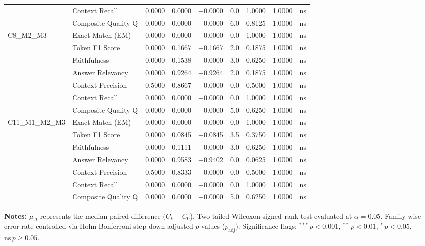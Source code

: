 \begin{table}[p]
\begin{tabular*}{\textwidth}{@{\extracolsep{\fill}} l l r r r r r r c @{}}
               & Context Recall      & 0.0000 & 0.0000 & +0.0000 & 0.0 & 1.0000 & 1.0000 & ns \\
               & Composite Quality Q & 0.0000 & 0.0000 & +0.0000 & 6.0 & 0.8125 & 1.0000 & ns \\
\addlinespace
C8\_M2\_M3      & Exact Match (EM)    & 0.0000 & 0.0000 & +0.0000 & 0.0 & 1.0000 & 1.0000 & ns \\
               & Token F1 Score      & 0.0000 & 0.1667 & +0.1667 & 2.0 & 0.1875 & 1.0000 & ns \\
               & Faithfulness        & 0.0000 & 0.1538 & +0.0000 & 3.0 & 0.6250 & 1.0000 & ns \\
               & Answer Relevancy    & 0.0000 & 0.9264 & +0.9264 & 2.0 & 0.1875 & 1.0000 & ns \\
               & Context Precision   & 0.5000 & 0.8667 & +0.0000 & 0.0 & 0.5000 & 1.0000 & ns \\
               & Context Recall      & 0.0000 & 0.0000 & +0.0000 & 0.0 & 1.0000 & 1.0000 & ns \\
               & Composite Quality Q & 0.0000 & 0.0000 & +0.0000 & 5.0 & 0.6250 & 1.0000 & ns \\
\addlinespace
C11\_M1\_M2\_M3 & Exact Match (EM)    & 0.0000 & 0.0000 & +0.0000 & 0.0 & 1.0000 & 1.0000 & ns \\
               & Token F1 Score      & 0.0000 & 0.0845 & +0.0845 & 3.5 & 0.3750 & 1.0000 & ns \\
               & Faithfulness        & 0.0000 & 0.1111 & +0.0000 & 3.0 & 0.6250 & 1.0000 & ns \\
               & Answer Relevancy    & 0.0000 & 0.9583 & +0.9402 & 0.0 & 0.0625 & 1.0000 & ns \\
               & Context Precision   & 0.5000 & 0.8333 & +0.0000 & 0.0 & 0.5000 & 1.0000 & ns \\
               & Context Recall      & 0.0000 & 0.0000 & +0.0000 & 0.0 & 1.0000 & 1.0000 & ns \\
               & Composite Quality Q & 0.0000 & 0.0000 & +0.0000 & 5.0 & 0.6250 & 1.0000 & ns \\
\bottomrule
\end{tabular*}
\vspace{0.5em}
\parbox{\textwidth}{\footnotesize
\textbf{Notes:} $\tilde{\mu}_\Delta$ represents the median paired difference ($C_k - C_0$). Two-tailed Wilcoxon signed-rank test evaluated at $\alpha = 0.05$. Family-wise error rate controlled via Holm-Bonferroni step-down adjusted $p$-values ($p_{\text{adj}}$). Significance flags: $^{***}\,p < 0.001$, $^{**}\,p < 0.01$, $^{*}\,p < 0.05$, $\text{ns}\,p \ge 0.05$.}
\end{table}
